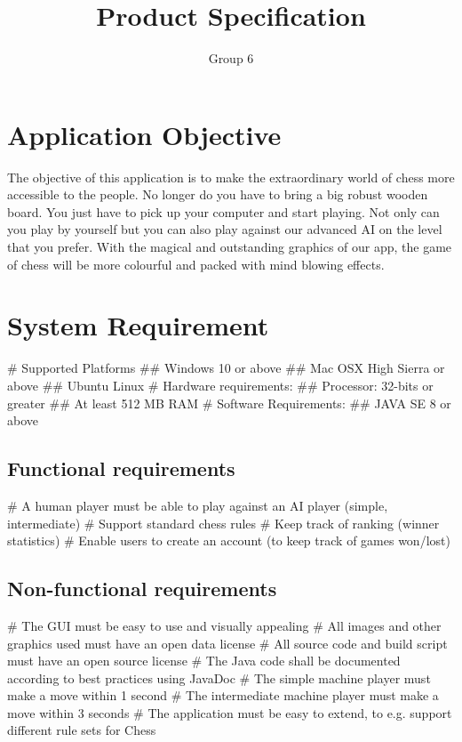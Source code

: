 \documentclass{article}
\begin{document}
\title{Product Specification}
\author{Group 6}
\maketitle

\section*{Application Objective}
The objective of this application is to make the extraordinary world of chess more accessible
to the people. No longer do you have to bring a big robust wooden board. You just have to
pick up your computer and start playing. Not only can you play by yourself but you can also play
against our advanced AI on the level that you prefer. With the magical and outstanding graphics
of our app, the game of chess will be more colourful and packed with mind blowing effects.

\section*{System Requirement}
\begin{easylist}[itemize]
# Supported Platforms 
## Windows 10 or above
## Mac OSX High Sierra or above
## Ubuntu Linux
# Hardware requirements:
## Processor: 32-bits or greater
## At least 512 MB RAM
# Software Requirements:
## JAVA SE 8 or above
\end{easylist}

\subsection*{Functional requirements}
\begin{easylist}[itemize]
# A human player must be able to play against an AI player (simple, intermediate)
# Support standard chess rules
# Keep track of ranking (winner statistics)
# Enable users to create an account (to keep track of games won/lost)
\end{easylist}

\subsection*{Non-functional requirements}
\begin{easylist}[itemize]
# The GUI must be easy to use and visually appealing
# All images and other graphics used must have an open data license
# All source code and build script must have an open source license
# The Java code shall be documented according to best practices using JavaDoc
# The simple machine player must make a move within 1 second
# The intermediate machine player must make a move within 3 seconds
# The application must be easy to extend, to e.g. support different rule sets for Chess
\end{easylist}
\end{document}
